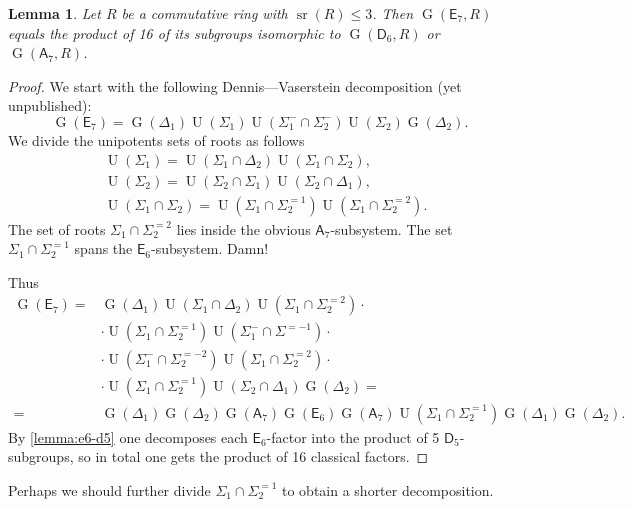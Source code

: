 \documentclass[oneside, 12pt]{amsart}
\theoremstyle{plain}
\numberwithin{equation}{section}
\newtheorem{lemma}{Lemma}
\numberwithin{lemma}{section}
\theoremstyle{definition}
\theoremstyle{remark}
\DeclareMathOperator{\G}{G}
\DeclareMathOperator{\U}{U}
\DeclareMathOperator{\sr}{sr}
\newcommand{\rA}{\mathsf{A}}
\newcommand{\rD}{\mathsf{D}}
\newcommand{\rE}{\mathsf{E}}
\begin{document}
\begin{lemma}
Let $R$ be a commutative ring with $\sr(R)\leqslant3$. Then $\G(\rE_7, R)$ equals the product of 16 of its subgroups isomorphic to $\G(\rD_6, R)$ or $\G(\rA_7, R)$.
\end{lemma}
\begin{proof}
We start with the following Dennis---Vaserstein decomposition (yet unpublished):
\[ \G(\rE_7) = \G(\Delta_1) \U(\Sigma_1) \U(\Sigma_1^-\cap\Sigma_2^-) \U(\Sigma_2) \G(\Delta_2). \]
We divide the unipotents sets of roots as follows
\begin{align*}
& \U(\Sigma_1) = \U(\Sigma_1\cap\Delta_2) \U(\Sigma_1\cap\Sigma_2), \\
& \U(\Sigma_2) = \U(\Sigma_2\cap\Sigma_1) \U(\Sigma_2\cap\Delta_1), \\
& \U(\Sigma_1\cap\Sigma_2) = \U(\Sigma_1\cap\Sigma_2^{=1}) \U(\Sigma_1\cap\Sigma_2^{=2}).
\end{align*}
The set of roots $\Sigma_1\cap\Sigma_2^{=2}$ lies inside the obvious $\rA_7$-subsystem. The set $\Sigma_1\cap\Sigma_2^{=1}$ spans the $\rE_6$-subsystem. Damn!

Thus
\begin{align*}
\G(\rE_7) ={} & \G(\Delta_1) \U(\Sigma_1\cap\Delta_2) \U(\Sigma_1\cap\Sigma_2^{=2}) \cdot{} \\
& \cdot \U(\Sigma_1\cap\Sigma_2^{=1}) \U(\Sigma_1^-\cap\Sigma^{=-1}) \cdot{} \\
& \cdot \U(\Sigma_1^-\cap\Sigma_2^{=-2}) \U(\Sigma_1\cap\Sigma_2^{=2}) \cdot{} \\
& \cdot \U(\Sigma_1\cap\Sigma_2^{=1}) \U(\Sigma_2\cap\Delta_1) \G(\Delta_2) = \\
={} & \G(\Delta_1) \G(\Delta_2) \G(\rA_7) \G(\rE_6) \G(\rA_7) \U(\Sigma_1\cap\Sigma_2^{=1}) \G(\Delta_1) \G(\Delta_2).
\end{align*}
By \cref{lemma:e6-d5} one decomposes each $\rE_6$-factor into the product of 5 $\rD_5$-subgroups, so in total one gets the product of 16 classical factors.
\end{proof}
Perhaps we should further divide $\Sigma_1\cap\Sigma_2^{=1}$ to obtain a shorter decomposition.
\printbibliography
\end{document}
